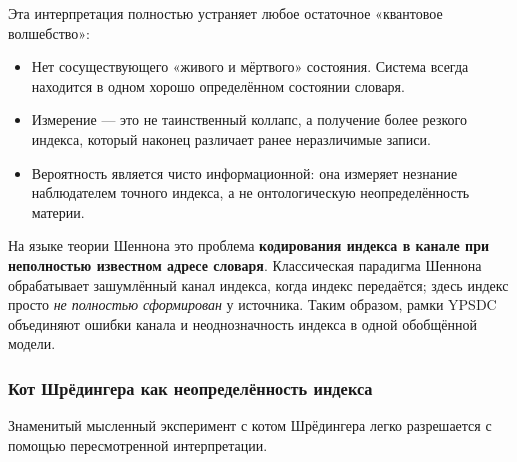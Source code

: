 \documentclass[12pt,a4paper]{article}
\theoremstyle{remark}
\begin{document}
	Эта интерпретация полностью устраняет любое остаточное «квантовое волшебство»:
	\begin{itemize}[leftmargin=*]
		\item Нет сосуществующего «живого и мёртвого» состояния. Система всегда находится в одном хорошо определённом состоянии словаря.
		\item Измерение — это не таинственный коллапс, а получение более резкого индекса, который наконец различает ранее неразличимые записи.
		\item Вероятность является чисто информационной: она измеряет незнание наблюдателем точного индекса, а не онтологическую неопределённость материи.
	\end{itemize}
	
	На языке теории Шеннона это проблема \textbf{кодирования индекса в канале при неполностью известном адресе словаря}. Классическая парадигма Шеннона обрабатывает зашумлённый канал индекса, когда индекс передаётся; здесь индекс просто \emph{не полностью сформирован} у источника. Таким образом, рамки YPSDC объединяют ошибки канала и неоднозначность индекса в одной обобщённой модели.
	
	\medskip
	
	\subsubsection{Кот Шрёдингера как неопределённость индекса}
	
	Знаменитый мысленный эксперимент с котом Шрёдингера легко разрешается с помощью пересмотренной интерпретации.
	
\end{document}
